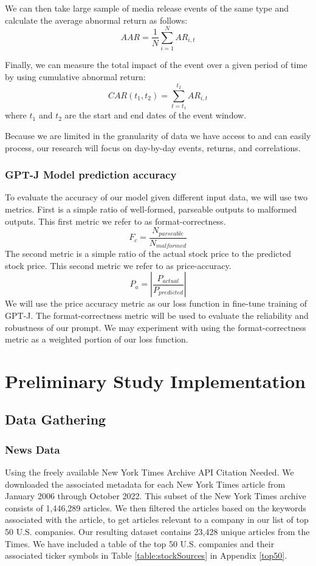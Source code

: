 \documentclass[conference]{IEEEtran}
\begin{document}
We can then take large sample of media release events of the same type and calculate the average abnormal return as follows:
\begin{equation}
    AAR= \frac{1}{N} \sum\limits_{i=1}^{N}AR_{i,t}
\end{equation}

Finally, we can measure the total impact of the event over a given period of time by using cumulative abnormal return:
\begin{equation}
    CAR(t_1,t_2)=\sum\limits_{t=t_1}^{t_2} AR_{i,t} 
\end{equation}
where $t_1$ and $t_2$ are the start and end dates of the event window.

Because we are limited in the granularity of data we have access to and can easily process, our research will focus on day-by-day events, returns, and correlations.

\subsubsection{GPT-J Model prediction accuracy}
To evaluate the accuracy of our model given different input data, we will use two metrics. First is a simple ratio of well-formed, parseable outputs to malformed outputs. This first metric we refer to as format-correctness. 
\begin{equation}
    F_c=\frac{N_{parseable}}{N_{malformed}}
\end{equation}
The second metric is a simple ratio of the actual stock price to the predicted stock price. This second metric we refer to as price-accuracy.
\begin{equation}
    P_a=\left|\frac{P_{actual}}{P_{predicted}}\right|
\end{equation}
We will use the price accuracy metric as our loss function in fine-tune training of GPT-J. The format-correctness metric will be used to evaluate the reliability and robustness of our prompt. We may experiment with using the format-correctness metric as a weighted portion of our loss function.
\section{Preliminary Study Implementation}
\subsection{Data Gathering} 
\subsubsection{News Data}
Using the freely available New York Times Archive API {Citation Needed}. We downloaded the associated metadata for each New York Times article from January 2006 through October 2022. This subset of the New York Times archive consists of 1,446,289 articles. We then filtered the articles based on the keywords associated with the article, to get articles relevant to a company in our list of top 50 U.S. companies. Our resulting dataset contains 23,428 unique articles from the Times. We have included a table of the top 50 U.S. companies and their associated ticker symbols in Table \ref{table:stockSources} in Appendix \ref{top50}.
\end{document}
